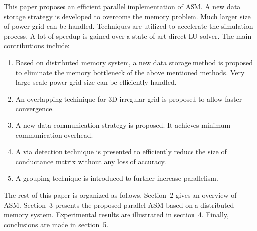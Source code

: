 \documentclass{sig-alternate}
\begin{document}
	This paper proposes an efficient parallel implementation of ASM. A new data storage strategy is developed to overcome the 
	memory problem. Much 
	larger size of power grid can be handled. Techniques are utilized to accelerate the simulation process. A lot of 
	speedup is gained over a state-of-art direct LU solver. The main contributions include:
	\begin{enumerate}[1)]
	\item Based on distributed memory system, a new data storage method is proposed to eliminate the memory bottleneck of
	the above mentioned methods. Very large-scale power grid size can be efficiently handled.
	\item An overlapping techinique for 3D irregular grid is proposed to allow faster convergence. 
	\item A new data communication strategy is proposed. It achieves minimum communication overhead.
	\item A via detection technique is presented to efficiently reduce the size of conductance matrix without any loss of accuracy.
	\item A grouping technique is introduced to further increase parallelism.
	\end{enumerate}

	The rest of this paper is organized as follows. Section~2 gives an overview of ASM. Section~3 presents 
	the proposed parallel ASM based on a distributed memory system. Experimental results are illustrated in section~4. 
	Finally, conclusions are made in section~5.
\end{document}
